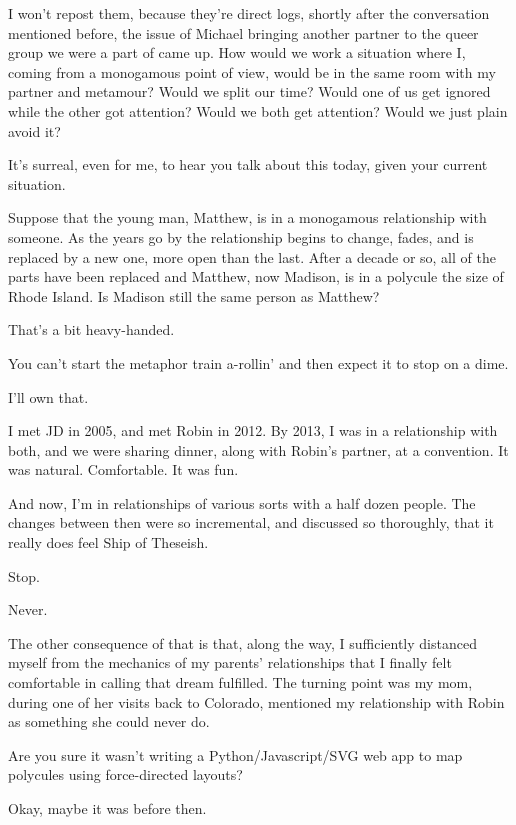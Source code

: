 \begin{leftcolumn}
\noindent I won't repost them, because they're direct logs, shortly after the conversation mentioned before, the issue of Michael bringing another partner to the queer group we were a part of came up. How would we work a situation where I, coming from a monogamous point of view, would be in the same room with my partner and metamour? Would we split our time? Would one of us get ignored while the other got attention? Would we both get attention? Would we just plain avoid it?

\begin{ally}
It's surreal, even for me, to hear you talk about this today, given your current situation.
\end{ally}
Suppose that the young man, Matthew, is in a monogamous relationship with someone. As the years go by the relationship begins to change, fades, and is replaced by a new one, more open than the last. After a decade or so, all of the parts have been replaced and Matthew, now Madison, is in a polycule the size of Rhode Island. Is Madison still the same person as Matthew?

\begin{ally}
That's a bit heavy-handed.
\end{ally}
You can't start the metaphor train a-rollin' and then expect it to stop on a dime.

\begin{ally}
I'll own that.
\end{ally}
I met JD in 2005, and met Robin in 2012. By 2013, I was in a relationship with both, and we were sharing dinner, along with Robin's partner, at a convention. It was natural. Comfortable. It was fun.

And now, I'm in relationships of various sorts with a half dozen people. The changes between then were so incremental, and discussed so thoroughly, that it really does feel Ship of Theseish.

\begin{ally}
Stop.
\end{ally}
Never.

The other consequence of that is that, along the way, I sufficiently distanced myself from the mechanics of my parents' relationships that I finally felt comfortable in calling that dream fulfilled. The turning point was my mom, during one of her visits back to Colorado, mentioned my relationship with Robin as something she could never do.

\begin{ally}
Are you sure it wasn't writing a Python/Javascript/SVG web app to map polycules using force-directed layouts?
\end{ally}
Okay, maybe it was before then.


\end{leftcolumn}
